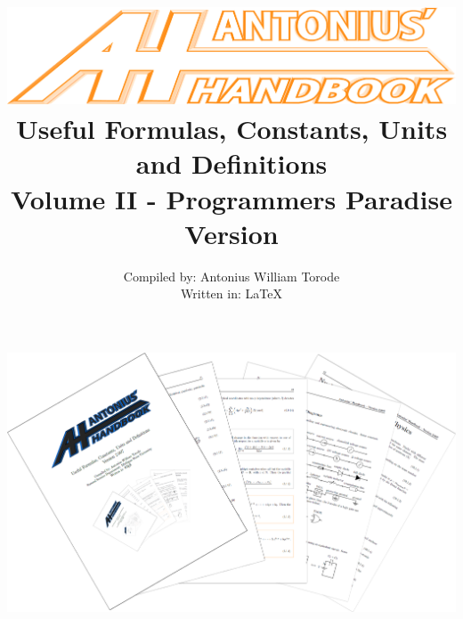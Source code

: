 \documentclass[openany,twoside, notitlepage,letterpaper,11pt]{book}
\title{\includegraphics[scale=.22]{./Images/Covers/AH3.png}
	\\ \vspace{1.5cm} Useful Formulas, Constants, Units and Definitions \\ Volume II - Programmers Paradise \\ Version \Version}
\date{}
\author{Compiled by: Antonius William Torode\\ Written in: \LaTeX}
\begin{document}
\frontmatter
\maketitle
\thispagestyle{empty}
\pagestyle{empty}
\begin{center}
	\includegraphics[scale=1.8]{./Images/Covers/background_tunnel.png}
\end{center}





\thispagestyle{empty}

\tableofcontents


\setlength{\parindent}{0pt}
\mainmatter
\pagestyle{fancy}


\newpage


\newpage


\newpage


%

\newpage


\newpage


\newpage


\newpage


%

%

\newpage


%

%

%

\newpage




\backmatter

\printindex
\end{document}
